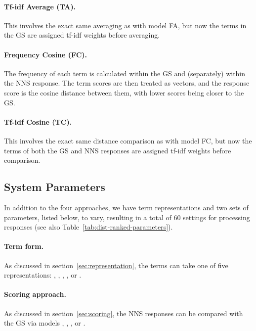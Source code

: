 \paragraph{Tf-idf Average (TA).} This involves the exact same
averaging as with model FA, but now the terms in the GS are assigned
tf-idf weights before averaging.

\paragraph{Frequency Cosine (FC).} The frequency of each term is
calculated within the GS and (separately) within the NNS response. 
The term scores are then treated as vectors, and the response score is
the cosine distance between them, with lower scores being closer to
the GS.

\paragraph{Tf-idf Cosine (TC).} This involves the exact same
distance comparison as with model FC, but now the terms of both the GS
and NNS responses are assigned tf-idf weights before comparison.

\subsection{System Parameters}
\label{sec:parameters}

In addition to the four approaches, we have term representations and
two sets of parameters, listed below, to vary, resulting in a total of
60 settings for processing responses (see also
Table~\ref{tab:dist-ranked-parameters}). 

\paragraph{Term form.} As discussed in
section~\ref{sec:representation}, the terms can take one of five
representations: , , , ,
or .

\paragraph{Scoring approach.} As discussed in
section~\ref{sec:scoring}, the NNS responses can be
compared with the GS via models , , , or .

